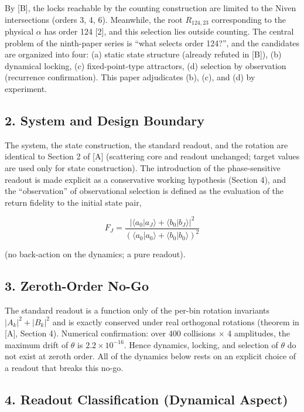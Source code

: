 \documentclass[
  a4paper,
]{article}
\begin{document}
By {[}B{]}, the locks reachable by the counting construction are limited
to the Niven intersections (orders 3, 4, 6). Meanwhile, the root
\(R_{124,23}\) corresponding to the physical \(\alpha\) has order 124
{[}2{]}, and this selection lies outside counting. The central problem
of the ninth-paper series is ``what selects order 124?'', and the
candidates are organized into four: (a) static state structure (already
refuted in {[}B{]}), (b) dynamical locking, (c) fixed-point-type
attractors, (d) selection by observation (recurrence confirmation). This
paper adjudicates (b), (c), and (d) by experiment.

\subsection{2. System and Design
Boundary}\label{system-and-design-boundary}

The system, the state construction, the standard readout, and the
rotation are identical to Section 2 of {[}A{]} (scattering core and
readout unchanged; target values are used only for state construction).
The introduction of the phase-sensitive readout is made explicit as a
conservative working hypothesis (Section 4), and the ``observation'' of
observational selection is defined as the evaluation of the return
fidelity to the initial state pair,

\[
F_J=\frac{|\langle a_0|a_J\rangle+\langle b_0|b_J\rangle|^2}{(\langle a_0|a_0\rangle+\langle b_0|b_0\rangle)^2}
\]

(no back-action on the dynamics; a pure readout).

\subsection{3. Zeroth-Order No-Go}\label{zeroth-order-no-go}

The standard readout is a function only of the per-bin rotation
invariants \(|A_k|^2+|B_k|^2\) and is exactly conserved under real
orthogonal rotations (theorem in {[}A{]}, Section 4). Numerical
confirmation: over 400 collisions × 4 amplitudes, the maximum drift of
\(\theta\) is \(2.2\times10^{-16}\). Hence dynamics, locking, and
selection of \(\theta\) do not exist at zeroth order. All of the
dynamics below rests on an explicit choice of a readout that breaks this
no-go.

\subsection{4. Readout Classification (Dynamical
Aspect)}\label{readout-classification-dynamical-aspect}
\end{document}
